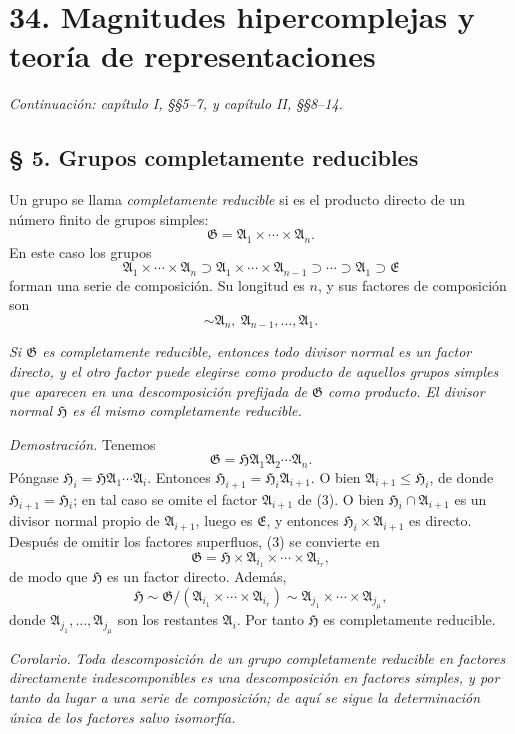 \documentclass[11pt]{article}
\providecommand{\mG}{\mathfrak{G}}
\providecommand{\mA}{\mathfrak{A}}
\providecommand{\mE}{\mathfrak{E}}
\providecommand{\mH}{\mathfrak{H}}
\begin{document}
\setcounter{footnote}{0}
\section*{34. Magnitudes hipercomplejas y teoría de representaciones}
\emph{Continuación: capítulo I, §§5--7, y capítulo II, §§8--14.}

\subsection*{§ 5. Grupos completamente reducibles}

Un grupo se llama \emph{completamente reducible} si es el producto directo de un número finito de grupos simples:
\[
        \mG=\mA_1\times\cdots\times\mA_n.
\]
En este caso los grupos
\[
        \mA_1\times\cdots\times\mA_n
        \supset \mA_1\times\cdots\times\mA_{n-1}
        \supset\cdots\supset \mA_1\supset \mE
\]
forman una serie de composición. Su longitud es $n$, y sus factores de composición son
\[
        \sim \mA_n,\ \mA_{n-1},\ldots,\mA_1.
\]

\emph{Si $\mG$ es completamente reducible, entonces todo divisor normal es un factor directo, y el otro factor puede elegirse como producto de aquellos grupos simples que aparecen en una descomposición prefijada de $\mG$ como producto. El divisor normal $\mH$ es él mismo completamente reducible.}

\emph{Demostración.} Tenemos
\begin{equation}
        \mG=\mH\mA_1\mA_2\cdots\mA_n.             \tag{3}
\end{equation}
Póngase $\mH_i=\mH\mA_1\cdots\mA_i$. Entonces $\mH_{i+1}=\mH_i\mA_{i+1}$. O bien $\mA_{i+1}\leq \mH_i$, de donde $\mH_{i+1}=\mH_i$; en tal caso se omite el factor $\mA_{i+1}$ de (3). O bien $\mH_i\cap\mA_{i+1}$ es un divisor normal propio de $\mA_{i+1}$, luego es $\mE$, y entonces $\mH_i\times\mA_{i+1}$ es directo. Después de omitir los factores superfluos, (3) se convierte en
\[
        \mG=\mH\times\mA_{i_1}\times\cdots\times\mA_{i_r},
\]
de modo que $\mH$ es un factor directo. Además,
\[
        \mH\sim \mG/(\mA_{i_1}\times\cdots\times\mA_{i_r})
        \sim \mA_{j_1}\times\cdots\times\mA_{j_\mu},
\]
donde $\mA_{j_1},\ldots,\mA_{j_\mu}$ son los restantes $\mA_i$. Por tanto $\mH$ es completamente reducible.

\emph{Corolario.} \emph{Toda descomposición de un grupo completamente reducible en factores directamente indescomponibles es una descomposición en factores simples, y por tanto da lugar a una serie de composición; de aquí se sigue la determinación única de los factores salvo isomorfía.}
\end{document}
